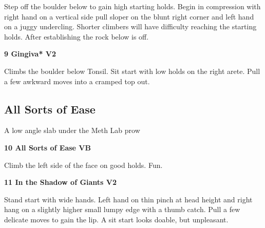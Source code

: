 \begin{multicols}{2}
\begin{minipage}{\linewidth}
					\begin{adjustwidth}{0.5cm}{}				
					Step off the boulder below to gain high starting holds. Begin in compression with right hand on a vertical side pull sloper on the blunt right corner and left hand on a juggy undercling.  Shorter climbers will have difficulty reaching the starting holds. After establishing the rock below is off.
					\end{adjustwidth}
					\end{minipage}
					\begin{minipage}{\linewidth}	
					\label{rt:Gingiva}
\colorbox{green!20}{
\parbox{0.95\textwidth}{
\textbf{
9 Gingiva* V2   
}
}
}

					\begin{adjustwidth}{0.5cm}{}				
					Climbs the boulder below Tonsil. Sit start with low holds on the right arete. Pull a few awkward moves into a cramped top out.
					\end{adjustwidth}
					\end{minipage}
			\subsection*{All Sorts of Ease}\label{bf:All Sorts of Ease}
			\begin{minipage}{\columnwidth}
			A low angle slab under the Meth Lab prow
			\end{minipage}
			

					\begin{minipage}{\linewidth}	
					\label{rt:All Sorts of Ease}
\colorbox{green!20}{
\parbox{0.95\textwidth}{
\textbf{
10 All Sorts of Ease VB    
}
}
}

					\begin{adjustwidth}{0.5cm}{}				
					Climb the left side of the face on good holds. Fun.
					\end{adjustwidth}
					\end{minipage}
					\begin{minipage}{\linewidth}	
					\label{rt:In the Shadow of Giants}
\colorbox{green!20}{
\parbox{0.95\textwidth}{
\textbf{
11 In the Shadow of Giants V2   
}
}
}

					\begin{adjustwidth}{0.5cm}{}				
					Stand start with wide hands. Left hand on thin pinch at head height and right hang on a slightly higher small lumpy edge with a thumb catch. Pull a few delicate moves to gain the lip. A sit start looks doable, but unpleasant.
					\end{adjustwidth}
					\end{minipage}

\end{multicols}
